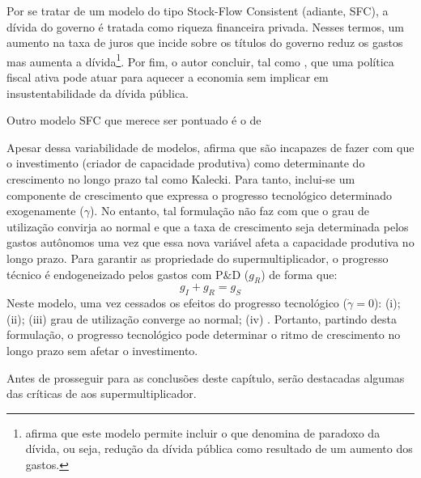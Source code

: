 Por se tratar de um modelo do tipo Stock-Flow Consistent (adiante, SFC), a dívida do governo é tratada como riqueza financeira privada. Nesses termos, um aumento na taxa de juros que incide sobre os títulos do governo reduz os gastos mas aumenta a dívida\footnote{\textcite{hein_autonomous_2018} afirma que este modelo permite incluir o que denomina de paradoxo da dívida, ou seja, redução da dívida pública como resultado de um aumento dos gastos.}. Por fim, o autor concluir, tal como \textcite{arestis_effectiveness_2012}, que uma política fiscal ativa pode atuar para aquecer a economia sem implicar em insustentabilidade da dívida pública.

Outro modelo SFC que merece ser pontuado é o de \textcite{brochier_supermultiplier_2018}


Apesar dessa variabilidade de modelos, \textcite{dutt_observations_2018} afirma que são incapazes de fazer com que o investimento (criador de capacidade produtiva) como determinante do crescimento no longo prazo tal como Kalecki. Para tanto, inclui-se um componente de crescimento que expressa o progresso tecnológico determinado exogenamente ($\gamma$). No entanto, tal formulação não faz com que o grau de utilização convirja ao normal e que a taxa de crescimento seja determinada pelos gastos autônomos uma vez que essa nova variável afeta a capacidade produtiva no longo prazo. Para garantir as propriedade do supermultiplicador, o progresso técnico é endogeneizado pelos gastos com P\&D ($g_R$) de forma que:
$$
g_I + g_R = g_S
$$
Neste modelo, uma vez cessados os efeitos do progresso tecnológico ($\dot \gamma = 0$): (i); (ii); (iii) grau de utilização converge ao normal; (iv) . Portanto, partindo desta formulação, o progresso tecnológico pode determinar o ritmo de crescimento no longo prazo sem afetar o investimento.


Antes de prosseguir para as conclusões deste capítulo, serão destacadas algumas das críticas de \textcite{nikiforos_comments_2018} aos supermultiplicador. 

